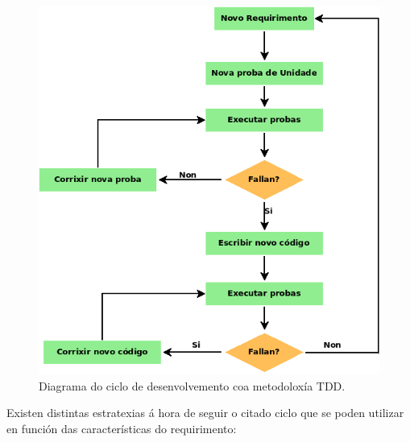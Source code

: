 \begin{figure}[h]
	\centering
	\includegraphics[scale=0.55,keepaspectratio=true]{./images/TDD.png}
	\caption{Diagrama do ciclo de desenvolvemento coa metodoloxía TDD.}
	\label{fig:tdd}
\end{figure}

Existen distintas estratexias á hora de seguir o citado ciclo \cite{tdd} que se poden utilizar en función das características do requirimento:

